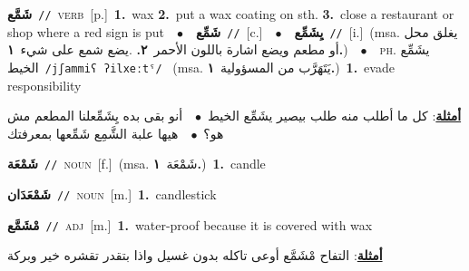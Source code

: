 \documentclass[10pt,a4paper,twoside]{article} %
\begin{document}
\begin{multicols}{2}
{\setlength\topsep{0pt}\textbf{\foreignlanguage{arabic}{شَمَّع}}\ {\color{gray}\texttt{//}\color{black}}\ \textsc{verb}\ [p.]\ \textbf{1.}~wax  \textbf{2.}~put a wax coating on sth.  \textbf{3.}~close a restaurant or shop where a red sign is put\ \ $\bullet$\ \ \setlength\topsep{0pt}\textbf{\foreignlanguage{arabic}{شَمِّع}}\ {\color{gray}\texttt{//}\color{black}}\ [c.]\ \ $\bullet$\ \ \setlength\topsep{0pt}\textbf{\foreignlanguage{arabic}{يِشَمِّع}}\ {\color{gray}\texttt{//}\color{black}}\ [i.]\ \color{gray}(msa. \foreignlanguage{arabic}{يغلق محل أو مطعم ويضع اشارة باللون الأحمر}~\foreignlanguage{arabic}{\textbf{٢.}}  .\foreignlanguage{arabic}{يضع شمع على شيء}~\foreignlanguage{arabic}{\textbf{١.}})\color{black}\ \ $\bullet$\ \ \textsc{ph.} \color{gray} \foreignlanguage{arabic}{يشَمِّع الخيط}\color{black}\ {\color{gray}\texttt{/{\sffamily jʃammiʕ ʔilxeːtˤ}/}\color{black}}\ \color{gray} (msa. \foreignlanguage{arabic}{يَتَهَرَّب من المسؤولية}~\foreignlanguage{arabic}{\textbf{١.}})\color{black}\ \textbf{1.}~evade responsibility\  \begin{flushright}\color{gray}\foreignlanguage{arabic}{\textbf{\underline{\foreignlanguage{arabic}{أمثلة}}}: كل ما أطلب منه طلب بيصير يشَمِّع الخيط\ $\bullet$\ \  أنو بقى بده يِشَمِّعلنا المطعم مش هو؟\ $\bullet$\ \  هيها علبة الشَّمِع شَمِّعها بمعرفتك}\end{flushright}\color{black}} \vspace{2mm}

{\setlength\topsep{0pt}\textbf{\foreignlanguage{arabic}{شَمْعَة}}\ {\color{gray}\texttt{//}\color{black}}\ \textsc{noun}\ [f.]\ \color{gray}(msa. \foreignlanguage{arabic}{شَمْعَة}~\foreignlanguage{arabic}{\textbf{١.}})\color{black}\ \textbf{1.}~candle\ } \vspace{2mm}

{\setlength\topsep{0pt}\textbf{\foreignlanguage{arabic}{شَمْعَدَان}}\ {\color{gray}\texttt{//}\color{black}}\ \textsc{noun}\ [m.]\ \textbf{1.}~candlestick\ } \vspace{2mm}

{\setlength\topsep{0pt}\textbf{\foreignlanguage{arabic}{مْشَمَّع}}\ {\color{gray}\texttt{//}\color{black}}\ \textsc{adj}\ [m.]\ \textbf{1.}~water-proof because it is covered with wax\  \begin{flushright}\color{gray}\foreignlanguage{arabic}{\textbf{\underline{\foreignlanguage{arabic}{أمثلة}}}: التفاح مْشَمَّع أوعى تاكله بدون غسيل واذا بتقدر تقشره خير وبركة}\end{flushright}\color{black}} \vspace{2mm}


\end{multicols}
\end{document}

